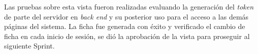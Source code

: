     Las pruebas sobre esta vista fueron realizadas evaluando la generación del \textit{token} de parte del servidor en \textit{back end} y su posterior uso para el acceso a las demás páginas del sistema. La ficha fue generada con éxito y verificado el cambio de ficha en cada inicio de sesión, se dió la aprobación de la vista para proseguir al siguiente Sprint.
    
%    
    
    
